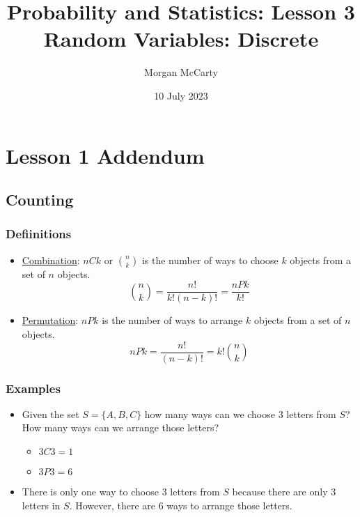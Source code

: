 \documentclass[12pt]{article}
\title{
    Probability and Statistics: Lesson 3
    \\Random Variables: Discrete}
\author{Morgan McCarty}
\date{10 July 2023}
\begin{document}
    \maketitle

    \section{Lesson 1 Addendum}
        \subsection{Counting}
            \subsubsection{Defiinitions}
                \begin{itemize}
                    \item \underline{Combination}: $nCk$ or $\binom{n}{k}$ is the number of ways to choose $k$ objects from a set of $n$ objects. \\
                    \begin{equation}
                        \binom{n}{k} = \frac{n!}{k!(n-k)!} = \frac{nPk}{k!}
                    \end{equation}
                    \item \underline{Permutation}: $nPk$ is the number of ways to arrange $k$ objects from a set of $n$ objects.
                    \begin{equation}
                        nPk = \frac{n!}{(n-k)!} = k!\binom{n}{k}
                    \end{equation}
                \end{itemize}
            \subsubsection{Examples}
                \begin{itemize}
                    \item Given the set $S = \{A, B, C\}$ how many ways can we choose $3$ letters from $S$? How many ways can we arrange those letters?
                    \begin{itemize}
                        \item $3C3 = 1$
                        \item $3P3 = 6$
                    \end{itemize}
                    \item There is only one way to choose $3$ letters from $S$ because there are only $3$ letters in $S$. However, there are $6$ ways to arrange those letters.
                \end{itemize}
\end{document}
